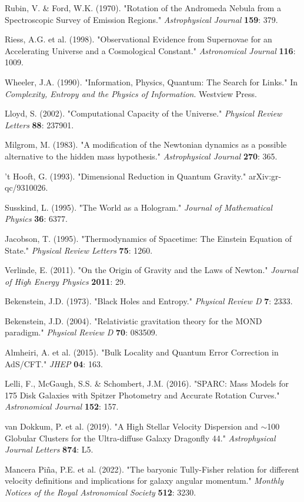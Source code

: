\documentclass[twocolumn,prd,amsmath,amssymb,aps,superscriptaddress,nofootinbib]{revtex4-2}
\begin{document}
\begin{thebibliography}{99}
 Rubin, V. \& Ford, W.K. (1970). "Rotation of the Andromeda Nebula from a Spectroscopic Survey of Emission Regions." \textit{Astrophysical Journal} \textbf{159}: 379.

 Riess, A.G. et al. (1998). "Observational Evidence from Supernovae for an Accelerating Universe and a Cosmological Constant." \textit{Astronomical Journal} \textbf{116}: 1009.

 Wheeler, J.A. (1990). "Information, Physics, Quantum: The Search for Links." In \textit{Complexity, Entropy and the Physics of Information}. Westview Press.

 Lloyd, S. (2002). "Computational Capacity of the Universe." \textit{Physical Review Letters} \textbf{88}: 237901.

 Milgrom, M. (1983). "A modification of the Newtonian dynamics as a possible alternative to the hidden mass hypothesis." \textit{Astrophysical Journal} \textbf{270}: 365.

 't Hooft, G. (1993). "Dimensional Reduction in Quantum Gravity." arXiv:gr-qc/9310026.

 Susskind, L. (1995). "The World as a Hologram." \textit{Journal of Mathematical Physics} \textbf{36}: 6377.

 Jacobson, T. (1995). "Thermodynamics of Spacetime: The Einstein Equation of State." \textit{Physical Review Letters} \textbf{75}: 1260.

 Verlinde, E. (2011). "On the Origin of Gravity and the Laws of Newton." \textit{Journal of High Energy Physics} \textbf{2011}: 29.

 Bekenstein, J.D. (1973). "Black Holes and Entropy." \textit{Physical Review D} \textbf{7}: 2333.

 Bekenstein, J.D. (2004). "Relativistic gravitation theory for the MOND paradigm." \textit{Physical Review D} \textbf{70}: 083509.

 Almheiri, A. et al. (2015). "Bulk Locality and Quantum Error Correction in AdS/CFT." \textit{JHEP} \textbf{04}: 163.

 Lelli, F., McGaugh, S.S. \& Schombert, J.M. (2016). "SPARC: Mass Models for 175 Disk Galaxies with Spitzer Photometry and Accurate Rotation Curves." \textit{Astronomical Journal} \textbf{152}: 157.

 van Dokkum, P. et al. (2019). "A High Stellar Velocity Dispersion and $\sim$100 Globular Clusters for the Ultra-diffuse Galaxy Dragonfly 44." \textit{Astrophysical Journal Letters} \textbf{874}: L5.

 Mancera Piña, P.E. et al. (2022). "The baryonic Tully-Fisher relation for different velocity definitions and implications for galaxy angular momentum." \textit{Monthly Notices of the Royal Astronomical Society} \textbf{512}: 3230.
\end{thebibliography}
\end{document}
